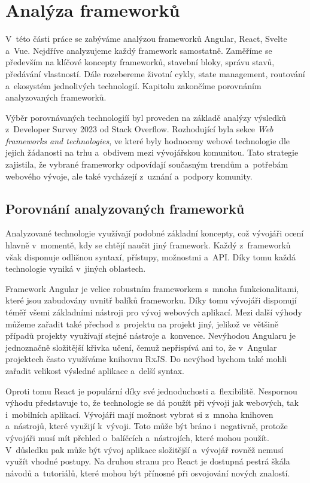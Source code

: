 \section{Analýza frameworků}

V~této části práce se zabýváme analýzou frameworků Angular, React, Svelte a~Vue. Nejdříve analyzujeme každý framework samostatně. 
Zaměříme se především na klíčové koncepty frameworků, stavební bloky, správu stavů, předávání vlastností. 
Dále rozebereme životní cykly, state management, routování a~ekosystém jednolivých technologií. 
Kapitolu zakončíme porovnáním analyzovaných frameworků.

Výběr porovnávaných technologiíí byl proveden na základě analýzy výsledků z~Developer Survey 2023 od Stack Overflow. 
Rozhodující byla sekce \emph{Web frameworks and technologies}, ve které byly hodnoceny webové technologie dle jejich žádanosti na trhu a~obdivem mezi vývojářskou komunitou. 
Tato strategie zajistila, že vybrané frameworky odpovídají současným trendům a~potřebám webového vývoje, ale také vycházejí z~uznání a~podpory komunity.\cite{stackoverflow, developersurvey}







\subsection{Porovnání analyzovaných frameworků}

Analyzované technologie využívají podobné základní koncepty, což vývojáři ocení hlavně v~momentě, kdy se chtějí naučit jiný framework. 
Každý z~frameworků však disponuje odlišnou syntaxí, přístupy, možnostmi a~API. Díky tomu každá technologie vyniká v~jiných oblastech.

Framework Angular je velice robustním frameworkem s~mnoha funkcionalitami, které jsou zabudovány uvnitř balíků frameworku. 
Díky tomu vývojáři disponují téměř všemi základními nástroji pro vývoj webových aplikací. 
Mezi další výhody můžeme zařadit také přechod z~projektu na projekt jiný, jelikož ve většině případů projekty využívají stejné nástroje a~konvence. 
Nevýhodou Angularu je jednoznačně složitější křivka učení, čemuž nepřispívá ani to, že v~Angular projektech často využíváme knihovnu RxJS. 
Do nevýhod bychom také mohli zařadit velikost výsledné aplikace a~delší syntax.

Oproti tomu React je populární díky své jednoduchosti a~flexibilitě. 
Nespornou výhodu představuje to, že technologie se dá použít při vývoji jak webových, tak i~mobilních aplikací. 
Vývojáři mají možnost vybrat si z~mnoha knihoven a~nástrojů, které využijí k~vývoji. 
Toto může být bráno i~negativně, protože vývojáři musí mít přehled o~balíčcích a~nástrojích, které mohou použít. 
V~důsledku pak může být vývoj aplikace složitější a~vývojář rovněž nemusí využít vhodné postupy. 
Na druhou stranu pro React je dostupná pestrá škála návodů a~tutoriálů, které mohou být přínosné při osvojování nových znalostí.

